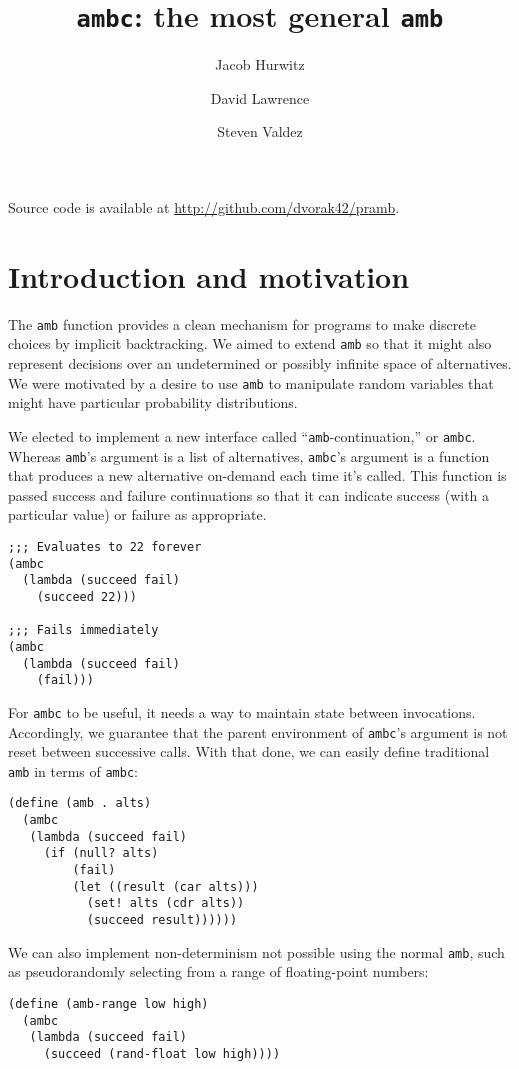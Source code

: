 \documentclass{article}
\title{\texttt{ambc}: the most general \texttt{amb}}
\author{Jacob Hurwitz \and David Lawrence \and Steven Valdez}
\begin{document}
\maketitle

\begin{center}
  Source code is available at \url{http://github.com/dvorak42/pramb}.
\end{center}

\section{Introduction and motivation}

The \texttt{amb} function provides a clean mechanism for programs to make
discrete choices by implicit backtracking.  We aimed to extend \texttt{amb} so
that it might also represent decisions over an undetermined or possibly
infinite space of alternatives.  We were motivated by a desire to use
\texttt{amb} to manipulate random variables that might have particular
probability distributions.

We elected to implement a new interface called ``\texttt{amb}-continuation,''
or \texttt{ambc}.  Whereas \texttt{amb}'s argument is a list of alternatives,
\texttt{ambc}'s argument is a function that produces a new alternative
on-demand each time it's called. This function is passed success and failure
continuations so that it can indicate success (with a particular value) or
failure as appropriate.

\begin{lstlisting}
;;; Evaluates to 22 forever
(ambc
  (lambda (succeed fail)
    (succeed 22)))

;;; Fails immediately
(ambc
  (lambda (succeed fail)
    (fail)))
\end{lstlisting}

For \texttt{ambc} to be useful, it needs a way to maintain state between
invocations.  Accordingly, we guarantee that the parent environment of
\texttt{ambc}'s argument is not reset between successive calls.  With that
done, we can easily define traditional \texttt{amb} in terms of \texttt{ambc}:
\begin{lstlisting}
(define (amb . alts)
  (ambc
   (lambda (succeed fail)
     (if (null? alts)
         (fail)
         (let ((result (car alts)))
           (set! alts (cdr alts))
           (succeed result))))))
\end{lstlisting}

We can also implement non-determinism not possible using the normal
\texttt{amb}, such as pseudorandomly selecting from a range of floating-point
numbers:
\begin{lstlisting}
(define (amb-range low high)
  (ambc
   (lambda (succeed fail)
     (succeed (rand-float low high))))
\end{lstlisting}
\end{document}
